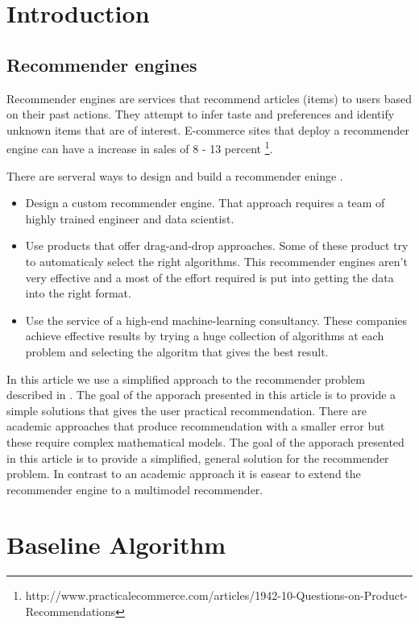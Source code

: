 \documentclass[twoside,a4paper]{article}
\begin{document}
\section{Introduction}
\label{sec:intro}

\subsection{Recommender engines}
\label{sec:recommenderengines}

Recommender engines are services that recommend articles (items) to users based on their past actions. They attempt to infer taste and preferences and identify unknown items that are of interest.
E-commerce sites that deploy a recommender engine can have a increase in sales of 8 - 13 percent \footnote{http://www.practicalecommerce.com/articles/1942-10-Questions-on-Product-Recommendations}.

There are serveral ways to design and build a recommender eninge \cite{Dunning}.

\begin{itemize}
\item Design a custom recommender engine. That approach requires a team of highly trained engineer and data scientist.
\item Use products that offer drag-and-drop approaches. Some of these product try to automaticaly select the right algorithms. This recommender engines aren't very effective and a most of the effort required is put into getting the data into the right format.
\item Use the service of a high-end machine-learning consultancy. These companies achieve effective results by trying a huge collection of algorithms at each problem and selecting the algoritm that gives the best result.
\end{itemize}

In this article we use a simplified approach to the recommender problem described in \cite{Dunning}. The goal of the apporach presented in this article is to provide a simple solutions that gives the user practical recommendation. There are academic approaches that produce recommendation with a smaller error but these require complex mathematical models. The goal of the apporach presented in this article is to provide a simplified, general solution for the recommender problem. In contrast to an academic approach it is easear to extend the recommender engine to a multimodel recommender.

\section{Baseline Algorithm}
\label{sec:baselinealgorithm}
\end{document}
